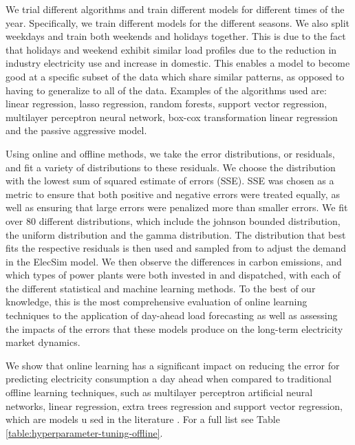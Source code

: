 \documentclass[final,3p,times,twocolumn,numbers]{elsarticle}
\begin{document}
We trial different algorithms and train different models for different times of the year. Specifically, we train different models for the different seasons. We also split weekdays and train both weekends and holidays together. This is due to the fact that holidays and weekend exhibit similar load profiles due to the reduction in industry electricity use and increase in domestic. This enables a model to become good at a specific subset of the data which share similar patterns, as opposed to having to generalize to all of the data. Examples of the algorithms used are: linear regression, lasso regression, random forests, support vector regression, multilayer perceptron neural network, box-cox transformation linear regression and the passive aggressive model. 



Using online and offline methods, we take the error distributions, or residuals, and fit a variety of distributions to these residuals. We choose the distribution with the lowest sum of squared estimate of errors (SSE). SSE was chosen as a metric to ensure that both positive and negative errors were treated equally, as well as ensuring that large errors were penalized more than smaller errors. We fit over 80 different distributions, which include the johnson bounded distribution, the uniform distribution and the gamma distribution. The distribution that best fits the respective residuals is then used and sampled from to adjust the demand in the ElecSim model. We then observe the differences in carbon emissions, and which types of power plants were both invested in and dispatched, with each of the different statistical and machine learning methods. To the best of our knowledge, this is the most comprehensive evaluation of online learning techniques to the application of day-ahead load forecasting as well as assessing the impacts of the errors that these models produce on the long-term electricity market dynamics.





We show that online learning has a significant impact on reducing the error for predicting electricity consumption a day ahead when compared to traditional offline learning techniques, such as multilayer perceptron artificial neural networks, linear regression, extra trees regression and support vector regression, which are models u sed in the literature \cite{Lu1993, Ahmad2017, Chen2004}. For a full list see Table \ref{table:hyperparameter-tuning-offline}.
\end{document}
